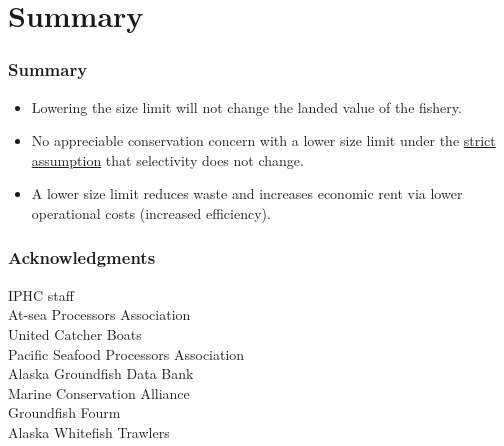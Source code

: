 \documentclass{beamer}
\begin{document}
\section{Summary} %
\label{sec:summary}
\begin{frame}[t]\frametitle{Summary}
	\begin{itemize}
		\item<+-> Lowering the size limit will not change the landed value of the fishery.
		\item<+-> No appreciable conservation concern with a lower size limit under the \underline{strict assumption} that selectivity does not change. 
		\item<+-> A lower size limit reduces waste and increases economic rent via lower operational costs (increased efficiency). 
	\end{itemize}
\end{frame}
\begin{frame}[m]\frametitle{Acknowledgments}
	IPHC staff\\
	At-sea Processors Association\\
	United Catcher Boats\\
	Pacific Seafood Processors Association\\
	Alaska Groundfish Data Bank\\
	Marine Conservation Alliance\\
	Groundfish Fourm\\
	Alaska Whitefish Trawlers\\
\end{frame}
\end{document}
